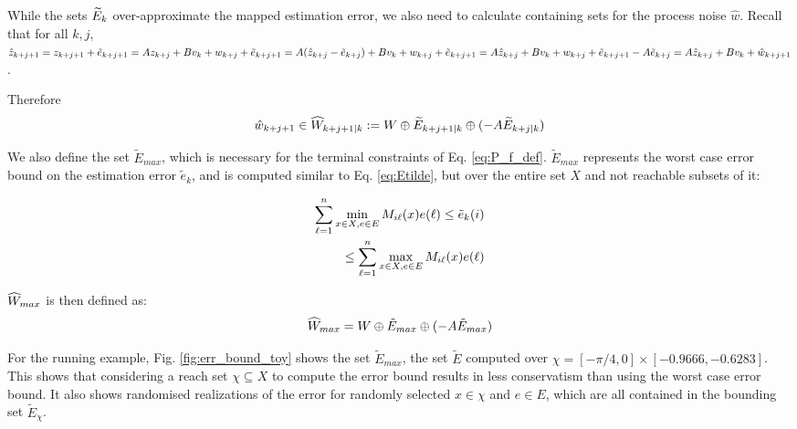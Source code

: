 While the sets $\widetilde{E}_{k}$ over-approximate the mapped estimation error, we also need to calculate containing sets for the process noise $\hat{w}$.
Recall that for all $k,j$, 
$\hat{z}_{k+j+1} = z_{k+j+1} + \tilde{e}_{k+j+1} = Az_{k+j}+Bv_k+w_{k+j} + \tilde{e}_{k+j+1} =  A(\hat{z}_{k+j} - \tilde{e}_{k+j}) + Bv_k + w_{k+j} + \tilde{e}_{k+j+1} = A\hat{z}_{k+j} + Bv_k + w_{k+j} + \tilde{e}_{k+j+1} - A \tilde{e}_{k+j} = A\hat{z}_{k+j} + Bv_k + \hat{w}_{k+j+1}$.

Therefore 
\begin{equation}
\label{eq:What}
\hat{w}_{k+j+1} \in \widehat{W}_{k+j+1|k} := W \oplus \widetilde{E}_{k+j+1|k} \oplus(-A\widetilde{E}_{k+j|k})
\end{equation}

We also define the set $\tilde{E}_{max}$, which is necessary for the terminal constraints of Eq. \ref{eq:P_f_def}. $\tilde{E}_{max}$ represents the worst case error bound on the estimation error $\tilde{e}_k$, and is computed similar to Eq. \ref{eq:Etilde}, but over the entire set $X$ and not reachable subsets of it:

\begin{eqnarray}
\label{eq:EtildeMax}
\sum_{\ell=1}^{n} \min_{x \in X, e \in E} M_{i\ell}(x)e(\ell)  \leq \tilde{e}_{k}(i) 
\nonumber 
\\
\leq \sum_{\ell=1}^{n} \max_{x \in X, e \in E} M_{i\ell}(x)e(\ell)
\end{eqnarray}

$\widehat{W}_{max}$ is then defined as:
\begin{equation}
\widehat{W}_{max} = W \oplus \tilde{E}_{max} \oplus (-A\tilde{E}_{max})
\end{equation}

For the running example, Fig. \ref{fig:err_bound_toy} shows the set $\tilde{E}_{max}$, the set $\tilde{E}$ computed over $\chi = [-\pi/4,0]\times[-0.9666,-0.6283]$. This shows that considering a reach set $\chi \subseteq X$ to compute the error bound results in less conservatism than using the worst case error bound. It also shows randomised realizations of the error for randomly selected $x \in \chi$ and $e \in E$, which are all contained in the bounding set $\tilde{E}_{\chi}$.

